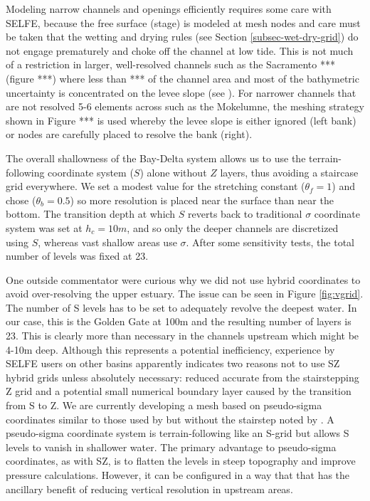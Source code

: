 Modeling narrow channels and openings efficiently requires some care with SELFE, because the free surface (stage)
is modeled at mesh nodes and care must be taken that the wetting and drying rules 
(see Section \ref{subsec-wet-dry-grid}) do not engage prematurely and choke off the channel at low tide. This is not much of a restriction in larger, well-resolved channels such as the Sacramento *** (figure ***) where less than *** of the channel area
and most of the bathymetric uncertainty is concentrated on the levee slope (see \citet{Wang12}). For narrower channels
that are not resolved 5-6 elements across such as the Mokelumne, the meshing strategy shown in Figure *** is used whereby the levee slope is either ignored (left bank) or nodes are carefully placed to resolve the bank (right).


The overall shallowness of the Bay-Delta system allows us to use the terrain-following coordinate system ($S$) alone without $Z$
layers, thus avoiding a staircase grid everywhere. We set a modest value for the stretching constant ($\theta_f=1$) and chose ($\theta_b=0.5$) so more resolution is placed near the surface  than near the bottom. The transition depth at which $S$
reverts back to traditional $\sigma$ coordinate system was set at $h_c=10m$, and so only the deeper channels are discretized using
$S$, whereas vast shallow areas use $\sigma$. After some sensitivity tests, the total number of levels was fixed at 23.

One outside commentator were curious why we did not use hybrid coordinates to avoid over-resolving the upper estuary. 
The issue can be seen in Figure \ref{fig:vgrid}. The number of S levels has to be set to 
adequately revolve the deepest water. In our case, this is the 
Golden Gate at 100m and the resulting number of layers is 23. This is clearly more 
than necessary in the channels upstream which might be 4-10m deep. Although this represents
a potential inefficiency, experience by SELFE users on other basins apparently indicates two reasons not to use
SZ hybrid grids unless absolutely necessary: reduced accurate from the stairstepping Z grid and
a potential small numerical boundary layer caused by the transition from S to Z. We are currently 
developing a mesh based on pseudo-sigma coordinates similar to those used by \citet{Dukhovskoy09} but without the
stairstep noted by \cite{Siddorn13}. A pseudo-sigma coordinate system is terrain-following like an S-grid
but allows S levels to vanish in shallower water. The primary advantage to pseudo-sigma coordinates, as with SZ,
is to flatten the levels in steep topography and improve pressure calculations. However, it can be configured in
a way that that has the ancillary benefit of reducing vertical resolution in upstream areas.


